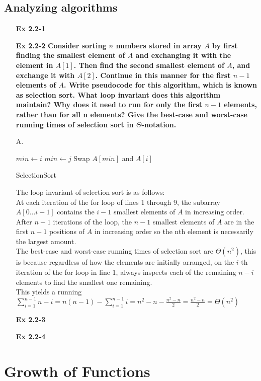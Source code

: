 \documentclass[fontsize=12pt,paper=a4,open=any]{book}
\begin{document}
\section{Analyzing algorithms}
\begin{enumerate}
	\item[\textbf{Ex 2.2-1}]

	\item[\textbf{Ex 2.2-2}]
		\textbf{Consider sorting $n$ numbers stored in array $A$ by first finding the smallest element of $A$ and exchanging it with the element in $A[1]$. Then find the second smallest element of $A$, and exchange it with $A[2]$. Continue in this manner for the first $n-1$ elements of $A$. Write pseudocode for this algorithm, which is known as selection sort. What loop invariant does this algorithm maintain? Why does it need to run for only the first $n-1$ elements, rather than for all n elements? Give the best-case and worst-case running times of selection sort in $\Theta$-notation.}

	\item[A.]
		\begin{algorithm}[H]

			\DontPrintSemicolon

			{
				$min \longleftarrow i$\;
				{
					{
						$min \longleftarrow j$\;
					}
				}
				Swap $A[min]$ and $A[i]$\;
			}
			\caption{SelectionSort}
		\end{algorithm}

			The loop invariant of selection sort is as follows:\\
			At each iteration of the for loop of lines 1 through 9, the subarray $A[0 \dots i-1]$ contains the $i-1$ smallest elements of $A$ in increasing order. After $n-1$ iterations of the loop, the $n-1$ smallest elements of $A$ are in the first $n-1$ positions of $A$ in increasing order so the nth element is necessarily the largest amount.\\
			The best-case and worst-case running times of selection sort are $\Theta(n^2)$, this is because regardless of how the elements are initially arranged, on the $i$-th iteration of the for loop in line 1, always inspects each of the remaining $n-i$ elements to find the smallest one remaining. \\
			This yields a running \\
			$\sum_{i=1}^{n-1} n-i = n(n-1) - \sum_{i=1}^{n-1} i = n^2-n-\frac{n^2-n}{2} = \frac{n^2-n}{2} = \Theta(n^2)$

		\item[\textbf{Ex 2.2-3}]

		\item[\textbf{Ex 2.2-4}]
\end{enumerate}

\chapter{Growth of Functions}
\end{document}
